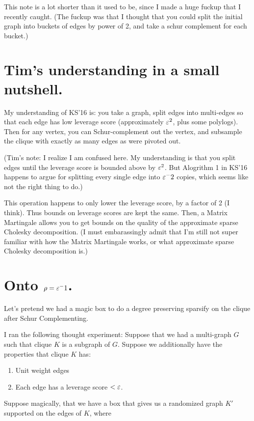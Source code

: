 

This note is a lot shorter than it used to be, since I made a huge
fuckup that I recently caught. (The fuckup was that I thought that you
could split the initial graph into buckets of edges by power of 2, and
take a schur complement for each bucket.)

\section{Tim's understanding in a small nutshell.}
My understanding of KS'16 is: you take a graph, split edges into
multi-edges so that each edge has low leverage score (approximately
$\varepsilon^2$, plus some polylogs). Then for any
vertex, you can Schur-complement out the vertex, and subsample the
clique with exactly as many edges as were pivoted out.

(Tim's note: I realize I am confused here. My understanding is that you
split edges until the leverage score is bounded above by $\varepsilon^2$. But
Alogrithm 1 in KS'16 happens to argue for splitting every single edge
into $\varepsilon^-2$ copies, which seems like not the right thing to do.)

This operation happens to only lower the leverage score, by a factor of
2 (I think). Thus bounds on leverage scores are kept the same. Then, a
Matrix Martingale allows you to get bounds on the quality of the
approximate sparse Cholesky decomposition. (I must embarassingly admit
that I'm still not super familiar with how the Matrix Martingale works,
or what approximate sparse Cholesky decomposition is.)

\section{Onto $\rho = \varepsilon^-1$.}

Let's pretend we had a magic box to do a degree preserving sparsify on
the clique after Schur Complementing. 

I ran the following thought experiment: Suppose that we had a
multi-graph $G$ such that clique $K$ is a subgraph of $G$. Suppose we
additionally have the properties that clique $K$ has:
\begin{enumerate}
  \item Unit weight edges
  \item Each edge has a leverage score $<\varepsilon$.
\end{enumerate}

Suppose magically, that we have a box that gives us a randomized graph $K'$
supported on the edges of $K$, where

